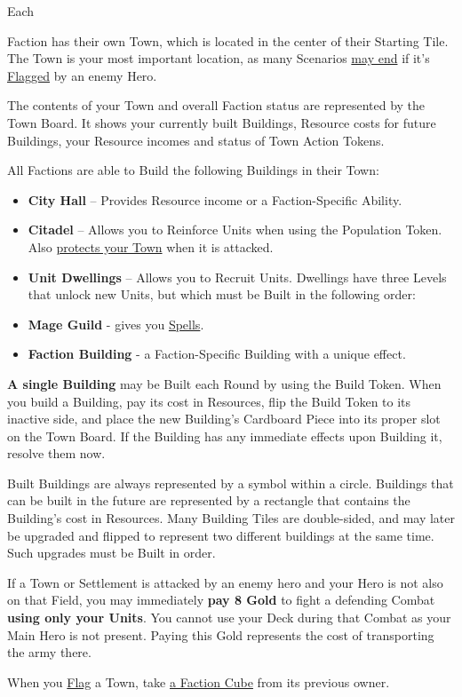 
\begin{multicols*}{2}

\hypertarget{Town}{Each} Faction has their own Town, which is located in the center of their Starting Tile.
The Town is your most important location, as many Scenarios \hyperlink{End}{may end} if it's \hyperlink{Categories}{Flagged} by an enemy Hero.\par
The contents of your Town and overall Faction status are represented by the Town Board.
It shows your currently built Buildings, Resource costs for future Buildings, your Resource incomes and status of Town Action Tokens.\par
All Factions are able to Build the following Buildings in their Town:
\begin{itemize}
  \item \textbf{City Hall} – Provides Resource income or a Faction-Specific Ability.
  \item \textbf{Citadel} – Allows you to Reinforce Units when using the Population Token.
Also \hyperlink{Walls}{protects your Town} when it is attacked.
  \item \textbf{Unit Dwellings} – Allows you to Recruit Units.
Dwellings have three Levels that unlock new Units, but which must be Built in the following order:
  \item \textbf{Mage Guild} - gives you \hyperlink{spells}{Spells}.
  \item \textbf{Faction Building} - a Faction-Specific Building with a unique effect.
\end{itemize}
\textbf{A single Building} may be Built each Round by using the Build Token.
When you build a Building, pay its cost in Resources, flip the Build Token to its inactive side, and place the new Building’s Cardboard Piece into its proper slot on the Town Board.
If the Building has any immediate effects upon Building it, resolve them now.\par
Built Buildings are always represented by a symbol within a circle.
Buildings that can be built in the future are represented by a rectangle that contains the Building's cost in Resources.
Many Building Tiles are double-sided, and may later be upgraded and flipped to represent two different buildings at the same time. Such upgrades must be Built in order.\par
If a Town or Settlement is attacked by an enemy hero and your Hero is not also on that Field, you may immediately \textbf{pay 8 Gold} to fight a defending Combat \textbf{using only your Units}.
You cannot use your Deck during that Combat as your Main Hero is not present.
Paying this Gold represents the cost of transporting the army there.\par
When you \hyperlink{Categories}{Flag} a Town, take \hyperlink{End}{a Faction Cube} from its previous owner.


\end{multicols*}
